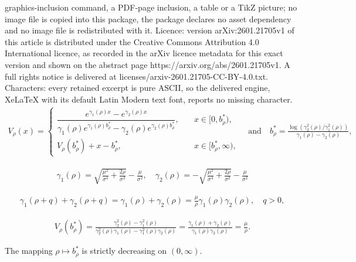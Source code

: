 \documentclass[10pt,a4paper]{amsart}
\begin{document}
graphics-inclusion command, a PDF-page inclusion, a table or a TikZ picture; no image file is copied into this package, the package declares no asset dependency and no image file is redistributed with it. Licence: version arXiv:2601.21705v1 of this article is distributed under the Creative Commons Attribution 4.0 International licence, as recorded in the arXiv licence metadata for this exact version and shown on the abstract page https://arxiv.org/abs/2601.21705v1. A full rights notice is delivered at licenses/arxiv-2601.21705-CC-BY-4.0.txt. Characters: every retained excerpt is pure ASCII, so the delivered engine, XeLaTeX with its default Latin Modern text font, reports no missing character.
\begin{align} \label{value_classical}
V_\rho(x) = \begin{cases}
\dfrac{e^{\gamma_1(\rho) x} - e^{\gamma_2(\rho)x}}{\gamma_1(\rho) e^{\gamma_1(\rho) b^*_\rho} - \gamma_2(\rho) e^{\gamma_2(\rho)b^*_\rho}}, 
\quad &x\in[0,b^*_\rho),\\
V_\rho(b^*_\rho) + x - b^*_\rho, 
\quad &x\in [b^*_\rho,\infty),
\end{cases}
\quad \text{and} \quad 
b_\rho^* = \frac{\log\left(\gamma_2^2(\rho) / \gamma_1^2(\rho)\right)}{\gamma_1(\rho)-\gamma_2(\rho)} ,
\end{align}

\begin{align} \label{gamma_def}
\gamma_1(\rho)= \sqrt{\frac{\mu^2}{\sigma^4}+\frac{2\rho}{\sigma^2}}-\frac{\mu}{\sigma^2},\quad \gamma_2(\rho)= -\sqrt{\frac{\mu^2}{\sigma^4}+\frac{2\rho}{\sigma^2}}-\frac{\mu}{\sigma^2}
\end{align}

\begin{align} \label{lemma_useful_results_gamma} 
\gamma_1(\rho+q) + \gamma_2(\rho + q)
= \gamma_1(\rho) + \gamma_2(\rho)
= \tfrac{\mu}{\rho}  \gamma_1(\rho) \gamma_2(\rho), 
\quad q > 0,
\end{align}

\begin{align} \label{lemma_useful_results_Vb}
V_{\rho}(b^*_{\rho})
=\frac{\gamma_2^2(\rho)-\gamma_1^2(\rho)}{\gamma_2^2(\rho)\gamma_1(\rho)-\gamma_1^2(\rho)\gamma_2(\rho)}
= \frac{\gamma_1(\rho) + \gamma_2(\rho)}{\gamma_1(\rho) \gamma_2(\rho)} = \frac{\mu}{\rho}.
\end{align}

\begin{lemma} \label{lemma_useful_results}
The mapping $\rho \mapsto b^*_{\rho}$ is strictly decreasing on $(0,\infty)$. 
\end{lemma} 
\end{document}
